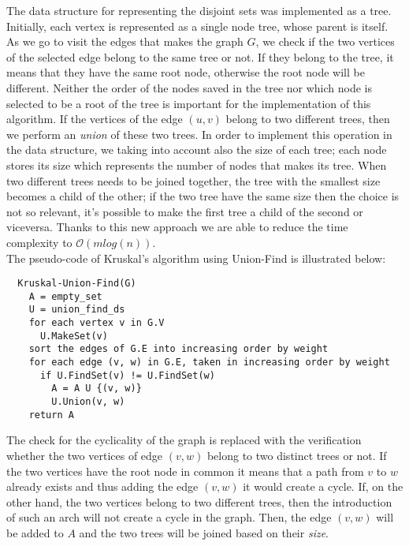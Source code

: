 \noindent
The data structure for representing the disjoint sets was implemented as a tree. Initially, each vertex is represented as a single node tree, whose parent is itself.
As we go to visit the edges that makes the graph $G$, we check if the two vertices of the selected edge belong to the same tree or not.
If they belong to the tree, it means that they have the same root node, otherwise the root node will be different.
Neither the order of the nodes saved in the tree nor which node is selected to be a root of the tree is important for the implementation of this algorithm.
If the vertices of the edge $(u, v)$ belong to two different trees, then we perform an \textit{union} of these two trees. In order to implement this operation in the data structure, we taking into account also the size of each tree;
each node stores its size which represents the number of nodes that makes its tree.
When two different trees needs to be joined together, the tree with the smallest size becomes a child of the other; if the two tree have the same size then the choice is not so relevant, 
it's possible to make the first tree a child of the second or viceversa.
Thanks to this new approach we are able to reduce the time complexity to $\mathcal{O}(m log(n))$. \\

\noindent
The pseudo-code of Kruskal's algorithm using Union-Find is illustrated below:
\begin{verbatim}
  Kruskal-Union-Find(G)
    A = empty_set
    U = union_find_ds
    for each vertex v in G.V
      U.MakeSet(v)
    sort the edges of G.E into increasing order by weight
    for each edge (v, w) in G.E, taken in increasing order by weight
      if U.FindSet(v) != U.FindSet(w)
        A = A U {(v, w)}
        U.Union(v, w)
    return A
\end{verbatim}
\noindent
The check for the cyclicality of the graph is replaced with the verification whether the two vertices of edge $(v, w)$ 
belong to two distinct trees or not. If the two vertices have the root node in common it means that a path from $v$ to $w$ already exists 
and thus adding the edge $(v, w)$ it would create a cycle.
If, on the other hand, the two vertices belong to two different trees, then the introduction of such an arch will 
not create a cycle in the graph.
Then, the edge $(v, w)$ will be added to $A$ and the two trees will be joined based on their \textit{size}.

